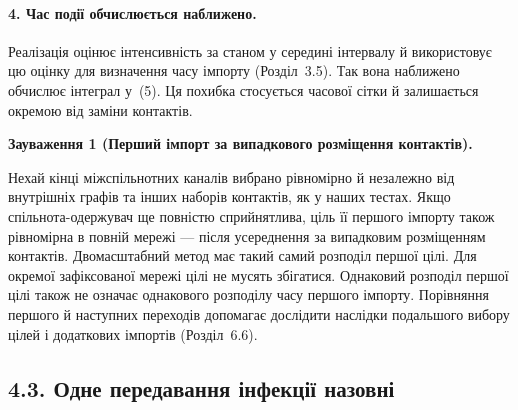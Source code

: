 \documentclass[11pt,a4paper]{article}
\begin{document}
\paragraph{4. Час події обчислюється наближено.}
Реалізація оцінює інтенсивність за станом у середині інтервалу й використовує цю оцінку для визначення часу імпорту (Розділ~3.5). Так вона наближено обчислює інтеграл у~(5). Ця похибка стосується часової сітки й залишається окремою від заміни контактів.
\par\noindent\textbf{Зауваження 1 (Перший імпорт за випадкового розміщення контактів).}\par\noindent 
Нехай кінці міжспільнотних каналів вибрано рівномірно й незалежно від внутрішніх графів та інших наборів контактів, як у наших тестах. Якщо спільнота-одержувач ще повністю сприйнятлива, ціль її першого імпорту також рівномірна в повній мережі --- після усереднення за випадковим розміщенням контактів. Двомасштабний метод має такий самий розподіл першої цілі. Для окремої зафіксованої мережі цілі не мусять збігатися. Однаковий розподіл першої цілі також не означає однакового розподілу часу першого імпорту. Порівняння першого й наступних переходів допомагає дослідити наслідки подальшого вибору цілей і додаткових імпортів (Розділ~6.6).
\par
\subsection*{4.3. Одне передавання інфекції назовні}
\end{document}

